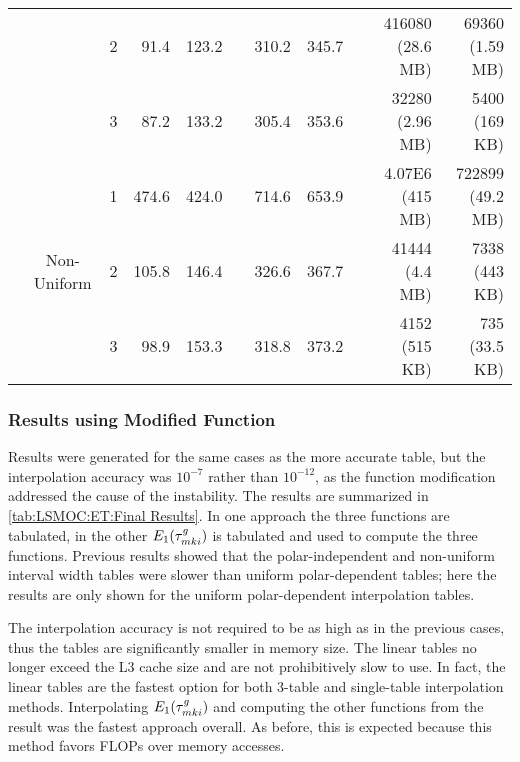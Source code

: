 {{{{\begin{table}
\begin{tabular}{@{}ccrrrrrrrrr@{}}
                                                                              && 2 &  91.4 & 123.2 && 310.2 & 345.7 && 416080 (28.6 MB) & 69360  (1.59 MB)\\\addlinespace[-0.2em]
                                                                              && 3 &  87.2 & 133.2 && 305.4 & 353.6 && 32280  (2.96 MB) & 5400    (169 KB)\\\cmidrule{2-11}\addlinespace[-0.2em]
                                                & \multirow{3}{*}{Non-Uniform} & 1 & 474.6 & 424.0 && 714.6 & 653.9 && 4.07E6  (415 MB) & 722899 (49.2 MB)\\\addlinespace[-0.2em]
                                                                              && 2 & 105.8 & 146.4 && 326.6 & 367.7 && 41444   (4.4 MB) & 7338   (443  KB)\\\addlinespace[-0.2em]
                                                                              && 3 &  98.9 & 153.3 && 318.8 & 373.2 && 4152    (515 KB) & 735    (33.5 KB)\\\bottomrule
          \end{tabular}
        \end{table}
      }
      \subsubsection{Results using Modified Function}{\label{sssec:LSMOC:ET:Results using Modified Function}
        Results were generated for the same cases as the more accurate table, but the interpolation accuracy was $10^{-7}$ rather than $10^{-12}$, as the function modification addressed the cause of the instability.
        The results are summarized in \cref{tab:LSMOC:ET:Final Results}.
        In one approach the three functions are tabulated, in the other $E_1(\segopt)$ is tabulated and used to compute the three functions.
        Previous results showed that the polar-independent and non-uniform interval width tables were slower than uniform polar-dependent tables; here the results are only shown for the uniform polar-dependent interpolation tables.

        The interpolation accuracy is not required to be as high as in the previous cases, thus the tables are significantly smaller in memory size.
        The linear tables no longer exceed the L3 cache size and are not prohibitively slow to use.
        In fact, the linear tables are the fastest option for both 3-table and single-table interpolation methods.
        Interpolating $E_1(\segopt)$ and computing the other functions from the result was the fastest approach overall.
        As before, this is expected because this method favors \acp{FLOP} over memory accesses.

}}}}
